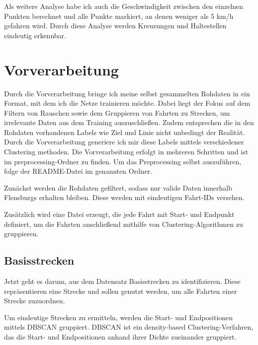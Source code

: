 \documentclass[a4paper]{article}
\begin{document}
    Als weitere Analyse habe ich auch die Geschwindigkeit zwischen den einzelnen Punkten berechnet und alle Punkte
    markiert, an denen weniger als 5 km/h gefahren wird. Durch diese Analyse werden Kreuzungen und Haltestellen
    eindeutig erkennbar.


    \section{Vorverarbeitung}
    \label{sec:vorverarbeitung}

    Durch die Vorverarbeitung bringe ich meine selbst gesammelten Rohdaten in ein Format, mit dem ich die Netze
    trainieren möchte. Dabei liegt der Fokus auf dem Filtern von Rauschen sowie dem Gruppieren von Fahrten zu Strecken,
    um irrelevante Daten aus dem Training auszuschließen. Zudem entsprechen die in den Rohdaten vorhandenen Labels wie
    Ziel und Linie nicht unbedingt der Realität. Durch die Vorverarbeitung generiere ich mir diese Labels mittels
    verschiedener Clustering methoden. Die Vorverarbeitung erfolgt in mehreren Schritten und ist im
    preprocessing-Ordner zu finden. Um das Preprocessing selbst auszuführen, folge der README-Datei im
    genannten Ordner.

    Zunächst werden die Rohdaten gefiltert, sodass nur valide Daten innerhalb Flensburgs erhalten bleiben. Diese werden
    mit eindeutigen Fahrt-IDs versehen.

    Zusätzlich wird eine Datei erzeugt, die jede Fahrt mit Start- und Endpunkt definiert, um die Fahrten anschließend
    mithilfe von Clustering-Algorithmen zu gruppieren.

    \subsection{Basisstrecken}
    \label{subsec:basisstrecken}

    Jetzt geht es darum, aus dem Datensatz Basisstrecken zu identifizieren. Diese repräsentieren eine Strecke und sollen
    genutzt werden, um alle Fahrten einer Strecke zuzuordnen.

    Um eindeutige Strecken zu ermitteln, werden die Start- und Endpositionen mittels DBSCAN\cite{ester1996dbscan}
    gruppiert. DBSCAN\cite{ester1996dbscan} ist ein density-based Clustering-Verfahren, das die Start- und Endpositionen
    anhand ihrer Dichte zueinander gruppiert.
\end{document}
